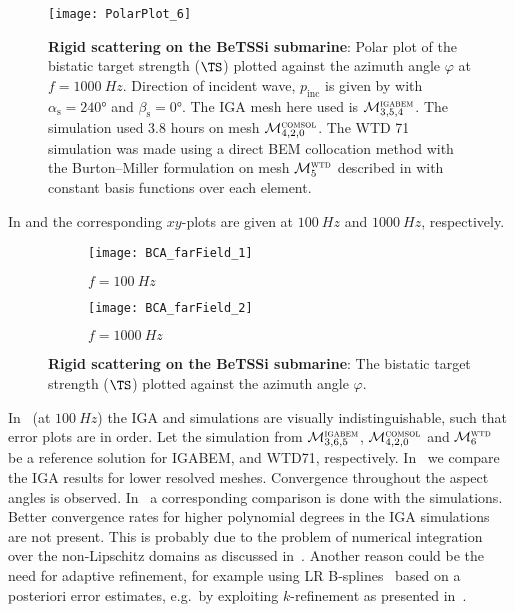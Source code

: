 \begin{figure}
	\centering
	\texttt{[image: PolarPlot\_6]}
	\caption{\textbf{Rigid scattering on the BeTSSi submarine}: Polar plot of the bistatic target strength ($\TS$) plotted against the azimuth angle $\varphi$ at $f=\SI{1000}{Hz}$. Direction of incident wave, $p_{\mathrm{inc}}$ is given by  with $\alpha_{\mathrm{s}}=\ang{240}$ and $\beta_{\mathrm{s}}=\ang{0}$. The IGA mesh here used is ${\cal M}_{3,5,4}^{\textsc{igabem}}$. The \COMSOL simulation used \num{3.8} hours on mesh ${\cal M}_{4,2,0}^{\textsc{comsol}}$. The WTD 71 simulation was made using a direct BEM collocation method with the Burton--Miller formulation on mesh ${\cal M}_{5}^{\textsc{wtd}}$ described in  with constant basis functions over each element.}
	\label{Eq3:polar_BI}
\end{figure}
In  and  the corresponding $xy$-plots are given at $\SI{100}{Hz}$ and $\SI{1000}{Hz}$, respectively.
\begin{figure}
	\centering
	\begin{subfigure}[t]{\textwidth}
		\texttt{[image: BCA\_farField\_1]}
		\caption{$f=\SI{100}{Hz}$}
		\label{Fig3:xy_BI_100}
	\end{subfigure} 
	\par\bigskip
	\par\bigskip
	\begin{subfigure}[t]{\textwidth}
		\texttt{[image: BCA\_farField\_2]}
		\caption{$f=\SI{1000}{Hz}$}
		\label{Fig3:xy_BI_1000}
	\end{subfigure} 
	\caption{\textbf{Rigid scattering on the BeTSSi submarine}: The bistatic target strength ($\TS$) plotted against the azimuth angle $\varphi$.}
\end{figure}
In~ (at $\SI{100}{Hz}$) the IGA and \COMSOL simulations are visually indistinguishable, such that error plots are in order. Let the simulation from ${\cal M}_{3,6,5}^{\textsc{igabem}}$, ${\cal M}_{4,2,0}^{\textsc{comsol}}$ and ${\cal M}_{6}^{\textsc{wtd}}$ be a reference solution for IGABEM, \COMSOL and WTD71, respectively. In~ we compare the IGA results for lower resolved meshes. Convergence throughout the aspect angles is observed. In~ a corresponding comparison is done with the \COMSOL simulations. Better convergence rates for higher polynomial degrees in the IGA simulations are not present. This is probably due to the problem of numerical integration over the non-Lipschitz domains as discussed in~. Another reason could be the need for adaptive refinement, for example using LR B-splines~\cite{Johannessen2014iau} based on a posteriori error estimates, e.g.\ by exploiting $k$-refinement as presented in~\cite{Kumar2015sap}.
